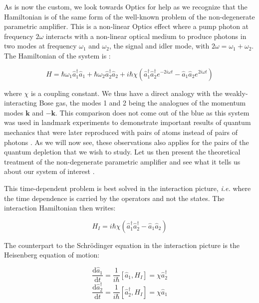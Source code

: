 \noindent As is now the custom, we look towards Optics for help as we recognize that the Hamiltonian is of the same form of the well-known problem of the non-degenerate parametric amplifier. This is a non-linear Optics effect where a pump photon at frequency $2 \omega$ interacts with a non-linear optical medium to produce photons in two modes at frequency $\omega_1$ and $\omega_2$, the signal and idler mode, with $2 \omega = \omega_1 + \omega_2$. The Hamiltonian of the system is \cite{walls2008}:

\begin{equation}
    H=\hbar \omega_1 \hat{a}_1^{\dagger} \hat{a}_1+ \hbar \omega_2 \hat{a}_2^{\dagger} \hat{a}_2 + i \hbar \chi (\hat{a}_1^{\dagger}  \hat{a}_2^{\dagger} e^{-2i\omega t} - \hat{a}_1 \hat{a}_2 e^{2i\omega t})
\end{equation}

\noindent where $\chi$ is a coupling constant. We thus have a direct analogy with the weakly-interacting Bose gas, the modes 1 and 2 being the analogues of the momentum modes $\bm{k}$ and $-\bm{k}$. This comparison does not come out of the blue as this system was used in landmark experiments \cite{burnham1970,heidmann1987observation} to demonstrate important results of quantum mechanics that were later reproduced with pairs of atoms instead of pairs of photons \cite{bucker2011,dall2009paired,perrin2007observation}. As we will now see, these observations also applies for the \kmk pairs of the quantum depletion that we wish to study. Let us then present the theoretical treatment of the non-degenerate parametric amplifier and see what it tells us about our system of interest \cite{hodgman2017solving}. 

This time-dependent problem is best solved in the interaction picture, {\it i.e.} where the time dependence is carried by the operators and not the states. The interaction Hamiltonian then writes:

\begin{equation}
    H_I=i \hbar \chi (\hat{a}_1^{\dagger}  \hat{a}_2^{\dagger} - \hat{a}_1 \hat{a}_2)
\end{equation}

\noindent The counterpart to the Schrödinger equation in the interaction picture is the Heisenberg equation of motion:

\begin{equation}
    \frac{\mathrm{d}\hat{a}_1}{\mathrm{d}t}= \frac{1}{i\hbar} [\hat{a}_1,H_I]=\chi \hat{a}_2^{\dagger}
\end{equation}
\begin{equation}
    \frac{\mathrm{d}\hat{a}_2^{\dagger}}{\mathrm{d}t}= \frac{1}{i\hbar} [\hat{a}_2^{\dagger},H_I]=\chi \hat{a}_1
\end{equation}

